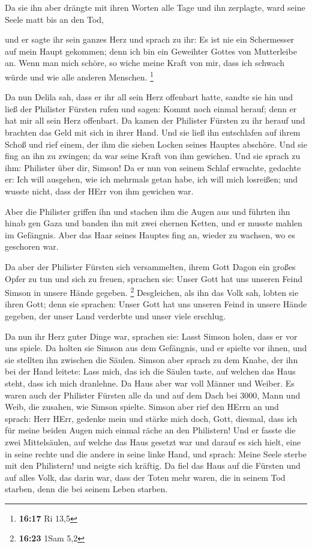  Da sie ihn aber drängte mit ihren Worten alle Tage und ihn
zerplagte, ward seine Seele matt bis an den Tod,

 und er sagte ihr sein ganzes Herz und sprach zu ihr: Es
ist nie ein Schermesser auf mein Haupt gekommen; denn ich bin ein
Geweihter Gottes von Mutterleibe an. Wenn man mich schöre, so wiche
meine Kraft von mir, dass ich schwach würde und wie alle anderen
Menschen. \footnote{\textbf{16:17} Ri 13,5}

 Da nun Delila sah, dass er ihr all sein Herz offenbart
hatte, sandte sie hin und ließ der Philister Fürsten rufen und sagen:
Kommt noch einmal herauf; denn er hat mir all sein Herz offenbart. Da
kamen der Philister Fürsten zu ihr herauf und brachten das Geld mit sich
in ihrer Hand.  Und sie ließ ihn entschlafen auf ihrem
Schoß und rief einem, der ihm die sieben Locken seines Hauptes abschöre.
Und sie fing an ihn zu zwingen; da war seine Kraft von ihm gewichen.
 Und sie sprach zu ihm: Philister über dir, Simson! Da er
nun von seinem Schlaf erwachte, gedachte er: Ich will ausgehen, wie ich
mehrmals getan habe, ich will mich losreißen; und wusste nicht, dass der
HErr von ihm gewichen war.

 Aber die Philister griffen ihn und stachen ihm die Augen
aus und führten ihn hinab gen Gaza und banden ihn mit zwei ehernen
Ketten, und er musste mahlen im Gefängnis.  Aber das Haar
seines Hauptes fing an, wieder zu wachsen, wo es geschoren war.

 Da aber der Philister Fürsten sich versammelten, ihrem
Gott Dagon ein großes Opfer zu tun und sich zu freuen, sprachen sie:
Unser Gott hat uns unseren Feind Simson in unsere Hände gegeben.
\footnote{\textbf{16:23} 1Sam 5,2}  Desgleichen, als ihn
das Volk sah, lobten sie ihren Gott; denn sie sprachen: Unser Gott hat
uns unseren Feind in unsere Hände gegeben, der unser Land verderbte und
unser viele erschlug.

 Da nun ihr Herz guter Dinge war, sprachen sie: Lasst
Simson holen, dass er vor uns spiele. Da holten sie Simson aus dem
Gefängnis, und er spielte vor ihnen, und sie stellten ihn zwischen die
Säulen.  Simson aber sprach zu dem Knabe, der ihn bei der
Hand leitete: Lass mich, das ich die Säulen taste, auf welchen das Haus
steht, dass ich mich dranlehne.  Da Haus aber war voll
Männer und Weiber. Es waren auch der Philister Fürsten alle da und auf
dem Dach bei 3000, Mann und Weib, die zusahen, wie Simson spielte.
 Simson aber rief den HErrn an und sprach: Herr HErr,
gedenke mein und stärke mich doch, Gott, diesmal, dass ich für meine
beiden Augen mich einmal räche an den Philistern!  Und er
fasste die zwei Mittelsäulen, auf welche das Haus gesetzt war und darauf
es sich hielt, eine in seine rechte und die andere in seine linke Hand,
 und sprach: Meine Seele sterbe mit den Philistern! und
neigte sich kräftig. Da fiel das Haus auf die Fürsten und auf alles
Volk, das darin war, dass der Toten mehr waren, die in seinem Tod
starben, denn die bei seinem Leben starben.

